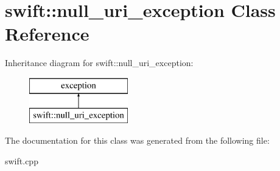 \hypertarget{classswift_1_1null__uri__exception}{\section{swift\-:\-:null\-\_\-uri\-\_\-exception Class Reference}
\label{classswift_1_1null__uri__exception}
}
Inheritance diagram for swift\-:\-:null\-\_\-uri\-\_\-exception\-:\begin{figure}[H]
\begin{center}
\leavevmode
\includegraphics[height=2.000000cm]{classswift_1_1null__uri__exception}
\end{center}
\end{figure}


The documentation for this class was generated from the following file\-:\begin{DoxyCompactItemize}
\item 
swift.\-cpp\end{DoxyCompactItemize}
